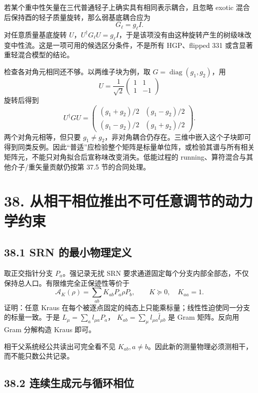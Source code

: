 \documentclass[
  11pt,
  oneside]{book}
\begin{document}
若某个重中性矢量在三代普通轻子上确实具有相同表示耦合，且忽略 exotic
混合后保持酉的轻子质量旋转，那么弱基底耦合应为 \[
G_\ell=g_\ell I.
\] 对任意质量基底旋转
\(U\)，\(U^\dagger G_\ell U=g_\ell I\)，于是该项没有由这种旋转产生的树级味改变中性流。这是一项可用的候选区分条件，不是所有
HGP、flipped 331 或含显著重轻混合模型的结论。

检查各对角元相同还不够。以两维子块为例，取
\(G=\operatorname{diag}(g_1,g_2)\)，用 \[
U=\frac1{\sqrt2}\begin{pmatrix}1&1\\1&-1\end{pmatrix}
\] 旋转后得到 \[
U^\dagger GU=
\begin{pmatrix}
(g_1+g_2)/2&(g_1-g_2)/2\\
(g_1-g_2)/2&(g_1+g_2)/2
\end{pmatrix}.
\] 两个对角元相等，但只要
\(g_1\ne g_2\)，非对角耦合仍存在。三维中嵌入这个子块即可得到同类反例。因此``普适''应检验整个矩阵是标量单位阵，或检验其谱与所有相关矩阵元，不能只对角拟合后宣称味改变消失。低能过程的
running、算符混合与其他介子/重矢量贡献仍按第 37.5 节的合同处理。

\hypertarget{ch-38}{%
\chapter{38. 从相干相位推出不可任意调节的动力学约束}\label{ch-38}}

\hypertarget{srn-ux7684ux6700ux5c0fux7269ux7406ux5b9aux4e49}{%
\section{38.1 SRN
的最小物理定义}\label{srn-ux7684ux6700ux5c0fux7269ux7406ux5b9aux4e49}}

取正交指针分支 \(P_a\)。强记录无扰 SRN
要求通道固定每个分支内部全部态，不仅保持总人口。有限维完全正保迹性等价于
\[
\mathcal A_K(\rho)=\sum_{ab}K_{ab}P_a\rho P_b,\qquad
K\succeq0,\quad K_{aa}=1.
\tag{38.1}
\] 证明：任意 Kraus
在每个被逐点固定的纯态上只能乘标量；线性性迫使同一分支的标量一致。于是
\(L_\mu=\sum_a l_{\mu a}P_a\)，
\(K_{ab}=\sum_\mu l_{\mu a}\bar l_{\mu b}\) 是 Gram 矩阵。反向用 Gram
分解构造 Kraus 即可。

相干父系统经公共读出可完全看不见
\(K_{ab},a\ne b\)。因此新的测量物理必须测相干，而不能只数公共记录。

\hypertarget{ux8fdeux7eedux751fux6210ux5143ux4e0eux5faaux73afux76f8ux4f4d}{%
\section{38.2
连续生成元与循环相位}\label{ux8fdeux7eedux751fux6210ux5143ux4e0eux5faaux73afux76f8ux4f4d}}
\end{document}
